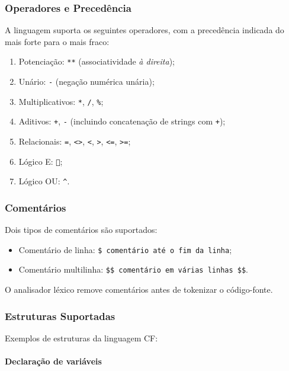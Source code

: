 \documentclass[12pt,a4paper]{article}
\begin{document}
\subsubsection*{Operadores e Precedência}

A linguagem suporta os seguintes operadores, com a precedência indicada do mais forte para o mais fraco:

\begin{enumerate}
  \item Potenciação: \texttt{**} (associatividade \emph{à direita});
  \item Unário: \texttt{-} (negação numérica unária);
  \item Multiplicativos: \texttt{*}, \texttt{/}, \texttt{\%};
  \item Aditivos: \texttt{+}, \texttt{-} (incluindo concatenação de strings com \texttt{+});
  \item Relacionais: \texttt{=}, \texttt{<>}, \texttt{<}, \texttt{>}, \texttt{<=}, \texttt{>=};
  \item Lógico E: \texttt{};
  \item Lógico OU: \texttt{^}.
\end{enumerate}

\subsubsection*{Comentários}

Dois tipos de comentários são suportados:

\begin{itemize}
  \item Comentário de linha: \lstinline!$ comentário até o fim da linha!;
  \item Comentário multilinha: \lstinline!$$ comentário em várias linhas $$!.
\end{itemize}

O analisador léxico remove comentários antes de tokenizar o código-fonte.

\subsubsection*{Estruturas Suportadas}

Exemplos de estruturas da linguagem CF:

\paragraph{Declaração de variáveis}
\end{document}
